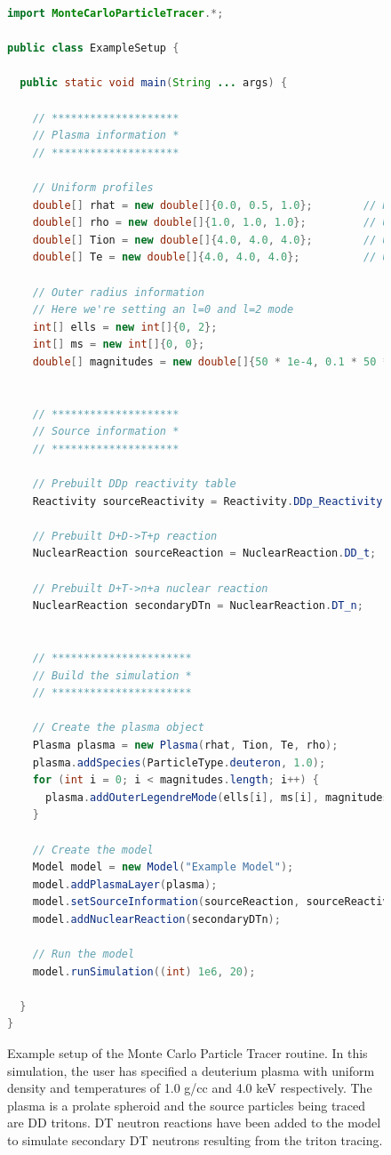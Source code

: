 	\begin{figure}
	\begin{lstlisting}[language=java, basicstyle=\ttfamily\scriptsize]
import MonteCarloParticleTracer.*;

public class ExampleSetup {
	
  public static void main(String ... args) {
		
    // ******************** 
    // Plasma information *
    // ********************
	
    // Uniform profiles 
    double[] rhat = new double[]{0.0, 0.5, 1.0};        // Normalized units
    double[] rho = new double[]{1.0, 1.0, 1.0};         // Units g/cc
    double[] Tion = new double[]{4.0, 4.0, 4.0};        // Units keV
    double[] Te = new double[]{4.0, 4.0, 4.0};          // Units in keV
	
    // Outer radius information
    // Here we're setting an l=0 and l=2 mode
    int[] ells = new int[]{0, 2};
    int[] ms = new int[]{0, 0};
    double[] magnitudes = new double[]{50 * 1e-4, 0.1 * 50 * 1e-4};
	
	
    // ******************** 
    // Source information *
    // ********************

    // Prebuilt DDp reactivity table
    Reactivity sourceReactivity = Reactivity.DDp_Reactivity; 

    // Prebuilt D+D->T+p reaction 
    NuclearReaction sourceReaction = NuclearReaction.DD_t;               
	
    // Prebuilt D+T->n+a nuclear reaction
    NuclearReaction secondaryDTn = NuclearReaction.DT_n;            
	
	
    // ********************** 
    // Build the simulation *
    // **********************
	
    // Create the plasma object
    Plasma plasma = new Plasma(rhat, Tion, Te, rho);
    plasma.addSpecies(ParticleType.deuteron, 1.0);
    for (int i = 0; i < magnitudes.length; i++) {
      plasma.addOuterLegendreMode(ells[i], ms[i], magnitudes[i]);
    }
	
    // Create the model
    Model model = new Model("Example Model");
    model.addPlasmaLayer(plasma);
    model.setSourceInformation(sourceReaction, sourceReactivity);
    model.addNuclearReaction(secondaryDTn);
	
    // Run the model
    model.runSimulation((int) 1e6, 20);
	
  }
}
	\end{lstlisting}
	\caption{Example setup of the Monte Carlo Particle Tracer routine. In this simulation, the user has specified a deuterium plasma with uniform density and temperatures of 1.0 g/cc and 4.0 keV respectively. The plasma is a prolate spheroid and the source particles being traced are DD tritons. DT neutron reactions have been added to the model to simulate secondary DT neutrons resulting from the triton tracing.} 
	\label{MonteCarloCode}
	\end{figure}

